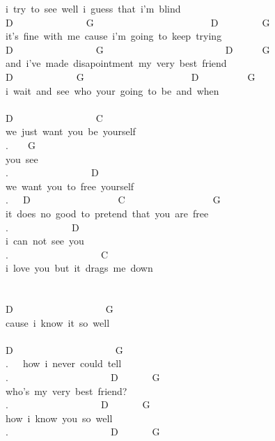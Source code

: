 {i\ try\ to\ see\ well\ i\ guess\ that\ i'm\ blind\\
D\ \ \ \ \ \ \ \ \ \ \ \ \ \ \ G\ \ \ \ \ \ \ \ \ \ \ \ \ \ \ \ \ \ \ \ \ \ \ \ D\ \ \ \ \ \ \ \ \ G\\
it's\ fine\ with\ me\ cause\ i'm\ going\ to\ keep\ trying\\
D\ \ \ \ \ \ \ \ \ \ \ \ \ \ \ \ \ G\ \ \ \ \ \ \ \ \ \ \ \ \ \ \ \ \ \ \ \ \ \ \ \ \ D\ \ \ \ \ \ G\\
and\ i've\ made\ disapointment\ my\ very\ best\ friend\\
D\ \ \ \ \ \ \ \ \ \ \ \ \ G\ \ \ \ \ \ \ \ \ \ \ \ \ \ \ \ \ \ \ \ \ \ D\ \ \ \ \ \ \ \ \ \ G\\
i\ wait\ and\ see\ who\ your\ going\ to\ be\ and\ when\\
\\
D\ \ \ \ \ \ \ \ \ \ \ \ \ \ \ \ \ C\\
we\ just\ want\ you\ be\ yourself\\
.\ \ \ \ G\\
you\ see\\
.\ \ \ \ \ \ \ \ \ \ \ \ \ \ \ \ \ D\\
we\ want\ you\ to\ free\ yourself\\
.\ \ \ D\ \ \ \ \ \ \ \ \ \ \ \ \ \ \ \ \ \ C\ \ \ \ \ \ \ \ \ \ \ \ \ \ \ \ \ \ G\\
it\ does\ no\ good\ to\ pretend\ that\ you\ are\ free\\
.\ \ \ \ \ \ \ \ \ \ \ \ \ D\\
i\ can\ not\ see\ you\\
.\ \ \ \ \ \ \ \ \ \ \ \ \ \ \ \ \ \ \ C\\
i\ love\ you\ but\ it\ drags\ me\ down\\
\\
\\
D\ \ \ \ \ \ \ \ \ \ \ \ \ \ \ \ \ \ \ G\\
cause\ i\ know\ it\ so\ well\\
\\
D\ \ \ \ \ \ \ \ \ \ \ \ \ \ \ \ \ \ \ \ \ G\\
.\ \ \ how\ i\ never\ could\ tell\\
.\ \ \ \ \ \ \ \ \ \ \ \ \ \ \ \ \ \ \ \ \ D\ \ \ \ \ \ \ G\\
who's\ my\ very\ best\ friend?\\
.\ \ \ \ \ \ \ \ \ \ \ \ \ \ \ \ \ \ \ D\ \ \ \ \ \ \ G\\
how\ i\ know\ you\ so\ well\\
.\ \ \ \ \ \ \ \ \ \ \ \ \ \ \ \ \ \ \ \ \ D\ \ \ \ \ \ \ G\\
}
